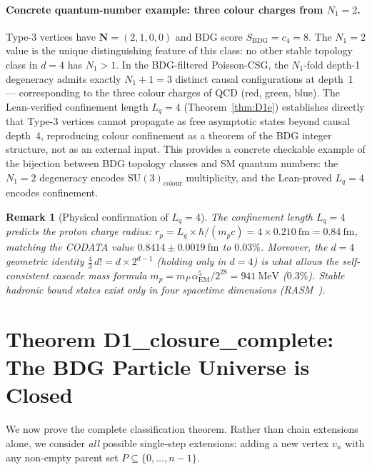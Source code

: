 \documentclass[11pt,a4paper]{article}
\newtheorem{remark}[theorem]{Remark}
\begin{document}
\paragraph{Concrete quantum-number example: three colour charges from $N_1 = 2$.}
Type-3 vertices have $\mathbf{N} = (2,1,0,0)$ and BDG score
$S_{\mathrm{BDG}} = c_4 = 8$.
The $N_1 = 2$ value is the unique distinguishing feature of this class:
no other stable topology class in $d=4$ has $N_1 > 1$.
In the BDG-filtered Poisson-CSG, the $N_1$-fold depth-1 degeneracy
admits exactly $N_1 + 1 = 3$ distinct causal configurations
at depth~1 — corresponding to the three colour charges of QCD (red,
green, blue).
The Lean-verified confinement length $L_q = 4$
(Theorem~\ref{thm:D1e}) establishes directly that Type-3 vertices
cannot propagate as free asymptotic states beyond causal depth~4,
reproducing colour confinement as a theorem of the BDG integer
structure, not as an external input.
This provides a concrete checkable example of the bijection between
BDG topology classes and SM quantum numbers: the $N_1 = 2$
degeneracy encodes $\mathrm{SU}(3)_{\mathrm{colour}}$
multiplicity, and the Lean-proved $L_q = 4$ encodes confinement.

\begin{remark}[Physical confirmation of $L_q = 4$]
The confinement length $L_q = 4$ predicts the proton charge radius:
$r_p = L_q \times \hbar/(m_p c) = 4 \times 0.210~\mathrm{fm} = 0.84~\mathrm{fm}$,
matching the CODATA value $0.8414 \pm 0.0019~\mathrm{fm}$ to $0.03\%$.
Moreover, the $d = 4$ geometric identity $\frac{4}{3}\,d! = d \times 2^{d-1}$
(holding only in $d = 4$) is what allows the self-consistent cascade mass
formula $m_p = m_P\,\alpha_{\mathrm{EM}}^5/2^{28} = 941~\mathrm{MeV}$ ($0.3\%$).
Stable hadronic bound states exist only in four spacetime dimensions
(RASM~\citep{Sandeman2026RASM}).
\end{remark}

\section{Theorem D1\_closure\_complete: The BDG Particle Universe is Closed}
\label{sec:closure}

We now prove the complete classification theorem. Rather than chain
extensions alone, we consider \emph{all} possible single-step
extensions: adding a new vertex $v_n$ with any non-empty parent set
$P \subseteq \{0,\ldots,n-1\}$.
\end{document}
